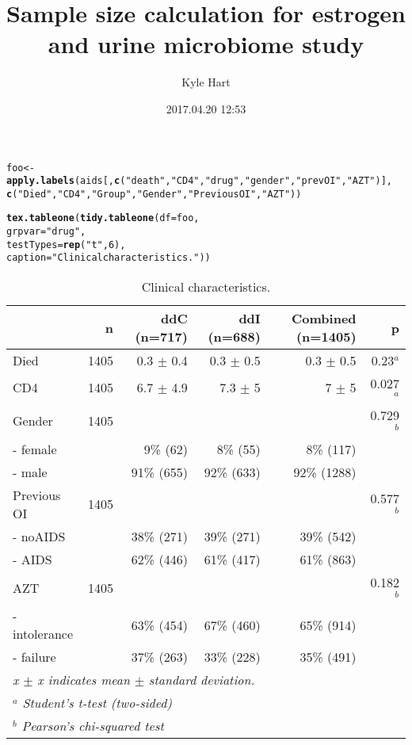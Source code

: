 \documentclass[noae]{analysis}\usepackage[]{graphicx}\usepackage[]{color}
\title{Sample size calculation for estrogen and urine microbiome study}
\author{Kyle Hart}
\date{2017.04.20 12:53}
\makeatletter
\newcommand{\hlnum}[1]{\textcolor[rgb]{0.686,0.059,0.569}{#1}}%
\newcommand{\hlstr}[1]{\textcolor[rgb]{0.192,0.494,0.8}{#1}}%
\newcommand{\hlstd}[1]{\textcolor[rgb]{0.345,0.345,0.345}{#1}}%
\newcommand{\hlkwb}[1]{\textcolor[rgb]{0.69,0.353,0.396}{#1}}%
\newcommand{\hlkwc}[1]{\textcolor[rgb]{0.333,0.667,0.333}{#1}}%
\newcommand{\hlkwd}[1]{\textcolor[rgb]{0.737,0.353,0.396}{\textbf{#1}}}%
\newenvironment{kframe}{%
 \def\at@end@of@kframe{}%
 \ifinner\ifhmode%
  \def\at@end@of@kframe{\end{minipage}}%
  \begin{minipage}{\columnwidth}%
 \fi\fi%
 \def\FrameCommand##1{\hskip\@totalleftmargin \hskip-\fboxsep
 \colorbox{shadecolor}{##1}\hskip-\fboxsep
     \hskip-\linewidth \hskip-\@totalleftmargin \hskip\columnwidth}%
 \MakeFramed {\advance\hsize-\width
   \@totalleftmargin\z@ \linewidth\hsize
   \@setminipage}}%
 {\par\unskip\endMakeFramed%
 \at@end@of@kframe}
\makeatother
\begin{document}
\maketitle



\begin{kframe}
\begin{alltt}
\hlstd{foo} \hlkwb{<-} \hlkwd{apply.labels}\hlstd{(aids[,}\hlkwd{c}\hlstd{(}\hlstr{"death"}\hlstd{,} \hlstr{"CD4"}\hlstd{,} \hlstr{"drug"}\hlstd{,} \hlstr{"gender"}\hlstd{,} \hlstr{"prevOI"}\hlstd{,} \hlstr{"AZT"}\hlstd{)],}
                    \hlkwd{c}\hlstd{(}\hlstr{"Died"}\hlstd{,} \hlstr{"CD4"}\hlstd{,} \hlstr{"Group"}\hlstd{,} \hlstr{"Gender"}\hlstd{,} \hlstr{"Previous OI"}\hlstd{,} \hlstr{"AZT"}\hlstd{))}

\hlkwd{tex.tableone}\hlstd{(}\hlkwd{tidy.tableone}\hlstd{(}\hlkwc{df} \hlstd{= foo,}
                           \hlkwc{grpvar}\hlstd{=}\hlstr{"drug"}\hlstd{,}
                           \hlkwc{testTypes} \hlstd{=} \hlkwd{rep}\hlstd{(}\hlstr{"t"}\hlstd{,} \hlnum{6}\hlstd{),}
                           \hlkwc{caption} \hlstd{=} \hlstr{"Clinical characteristics."}\hlstd{))}
\end{alltt}
\end{kframe}%
\begin{table}[H]
\centering
\caption{Clinical characteristics.} 
\label{o4rf0t9g4}
\begingroup\footnotesize
\begin{tabular}{lrrrrr}
  \hline
  & {\bf n} & {\bf ddC (n=717)} & {\bf ddI (n=688)} & {\bf Combined (n=1405)} & {\bf p} \\ 
  \hline
Died & 1405 & 0.3 $\pm$ 0.4 & 0.3 $\pm$ 0.5 & 0.3 $\pm$ 0.5 & 0.23$^a$ \\ 
  CD4 & 1405 & 6.7 $\pm$ 4.9 & 7.3 $\pm$ 5 & 7 $\pm$ 5 & 0.027$^a$ \\ 
  Gender & 1405 &   &   &   & 0.729$^b$ \\ 
   - female &   & 9\% (62) & 8\% (55) & 8\% (117) &   \\ 
   - male &   & 91\% (655) & 92\% (633) & 92\% (1288) &   \\ 
  Previous OI & 1405 &   &   &   & 0.577$^b$ \\ 
   - noAIDS &   & 38\% (271) & 39\% (271) & 39\% (542) &   \\ 
   - AIDS &   & 62\% (446) & 61\% (417) & 61\% (863) &   \\ 
  AZT & 1405 &   &   &   & 0.182$^b$ \\ 
   - intolerance &   & 63\% (454) & 67\% (460) & 65\% (914) &   \\ 
   - failure &   & 37\% (263) & 33\% (228) & 35\% (491) &   \\ 
   \hline
\multicolumn{6}{l}{\em x $\pm$ x indicates mean $\pm$ standard deviation.}\\
\multicolumn{6}{l}{\em $^a$ Student's t-test (two-sided)}\\
\multicolumn{6}{l}{\em $^b$ Pearson's chi-squared test}
\end{tabular}
\endgroup
\end{table}
\end{document}
